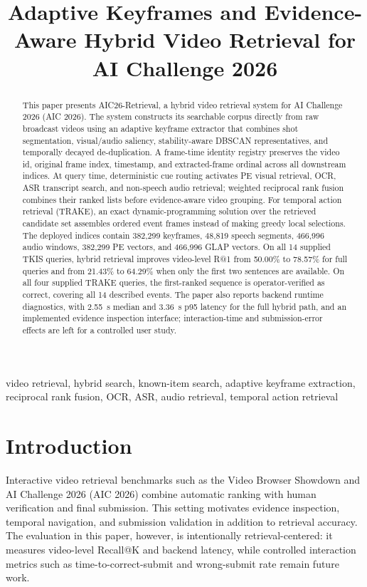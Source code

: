 \documentclass[conference]{IEEEtran}
\title{Adaptive Keyframes and Evidence-Aware Hybrid Video Retrieval for AI Challenge 2026}
\author{
\IEEEauthorblockN{\textbf{Huy Hoang Pham Le}\textsuperscript{1},
\textbf{Nhat Bao Vo}\textsuperscript{1},
\textbf{Nguyen Phat Huynh}\textsuperscript{1},
\textbf{Dinh Truong Vo}\textsuperscript{1}}
\IEEEauthorblockA{\textsuperscript{1}Faculty of Information Technology, University of Science,\\
Vietnam National University Ho Chi Minh City, Ho Chi Minh City, Vietnam.}
}
\newcommand{\sys}{AIC26-Retrieval}
\begin{document}
\maketitle

\begin{abstract}
This paper presents \sys{}, a hybrid video retrieval system for AI Challenge
2026 (AIC 2026). The system constructs its searchable corpus directly from raw
broadcast videos using an adaptive keyframe extractor that combines shot
segmentation, visual/audio saliency, stability-aware DBSCAN representatives, and
temporally decayed de-duplication. A frame-time identity registry preserves the
video id, original frame index, timestamp, and extracted-frame ordinal across
all downstream indices. At query time, deterministic cue routing activates PE
visual retrieval, OCR, ASR transcript search, and non-speech audio retrieval;
weighted reciprocal rank fusion combines their ranked lists before
evidence-aware video grouping. For temporal action retrieval (TRAKE), an exact
dynamic-programming solution over the retrieved candidate set assembles ordered
event frames instead of making greedy local selections. The deployed indices
contain 382,299 keyframes, 48,819 speech segments, 466,996 audio windows,
382,299 PE vectors,
and 466,996 GLAP vectors. On all 14 supplied TKIS queries, hybrid retrieval
improves video-level R@1 from 50.00\% to 78.57\% for full queries and from
21.43\% to 64.29\% when only the first two sentences are available. On all four
supplied TRAKE queries, the first-ranked sequence is operator-verified as correct,
covering all 14 described events. The paper also reports backend runtime
diagnostics, with 2.55~s median and 3.36~s p95 latency for the full hybrid path,
and an implemented evidence inspection interface; interaction-time and
submission-error effects are left for a controlled user study.
\end{abstract}

\begin{IEEEkeywords}
video retrieval, hybrid search, known-item search, adaptive keyframe extraction,
reciprocal rank fusion, OCR, ASR, audio retrieval, temporal action retrieval
\end{IEEEkeywords}

\section{Introduction}

Interactive video retrieval benchmarks such as the Video Browser Showdown
\cite{rossetto2025vbs2024,rossetto2025vbs2025} and AI Challenge 2026
(AIC 2026) combine automatic ranking with human verification and final
submission. This setting motivates evidence inspection, temporal navigation,
and submission validation in addition to retrieval accuracy. The evaluation in
this paper, however, is intentionally retrieval-centered: it measures
video-level Recall@K and backend latency, while controlled interaction metrics
such as time-to-correct-submit and wrong-submit rate remain future work.
\end{document}
